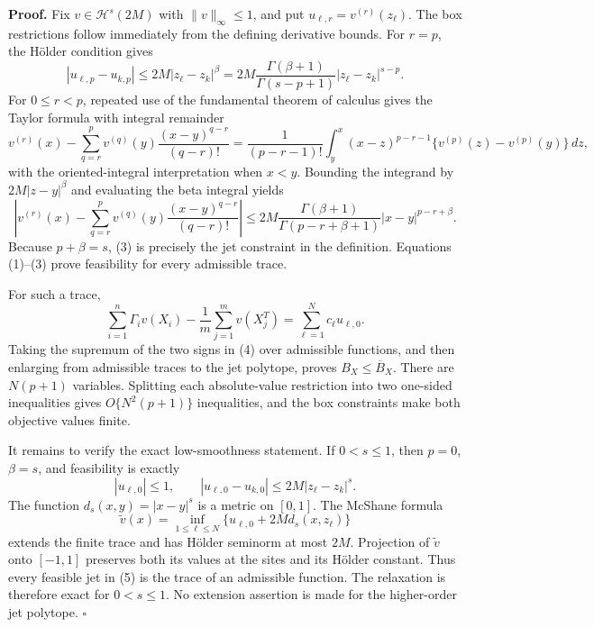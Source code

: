 \textbf{Proof.}
Fix \(v\in\mathcal H^s(2M)\) with \(\|v\|_\infty\le1\), and put \(u_{\ell,r}=v^{(r)}(z_\ell)\). The box restrictions follow immediately from the defining derivative bounds. For \(r=p\), the H\"older condition gives
\[
|u_{\ell,p}-u_{k,p}|\le2M|z_\ell-z_k|^\beta
=2M\frac{\Gamma(\beta+1)}{\Gamma(s-p+1)}|z_\ell-z_k|^{s-p}.
\tag{1}
\]
For \(0\le r<p\), repeated use of the fundamental theorem of calculus gives the Taylor formula with integral remainder
\[
v^{(r)}(x)-\sum_{q=r}^p v^{(q)}(y)\frac{(x-y)^{q-r}}{(q-r)!}
=\frac1{(p-r-1)!}\int_y^x(x-z)^{p-r-1}\{v^{(p)}(z)-v^{(p)}(y)\}\,dz,
\tag{2}
\]
with the oriented-integral interpretation when \(x<y\). Bounding the integrand by \(2M|z-y|^\beta\) and evaluating the beta integral yields
\[
\left|v^{(r)}(x)-\sum_{q=r}^p v^{(q)}(y)\frac{(x-y)^{q-r}}{(q-r)!}\right|
\le2M\frac{\Gamma(\beta+1)}{\Gamma(p-r+\beta+1)}|x-y|^{p-r+\beta}.
\tag{3}
\]
Because \(p+\beta=s\), (3) is precisely the jet constraint in the definition. Equations (1)--(3) prove feasibility for every admissible trace.

For such a trace,
\[
\sum_{i=1}^n\Gamma_i v(X_i)-\frac1m\sum_{j=1}^mv(X_j^T)
=\sum_{\ell=1}^Nc_\ell u_{\ell,0}.
\tag{4}
\]
Taking the supremum of the two signs in (4) over admissible functions, and then enlarging from admissible traces to the jet polytope, proves \(B_X\le\overline B_X\). There are \(N(p+1)\) variables. Splitting each absolute-value restriction into two one-sided inequalities gives \(O\{N^2(p+1)\}\) inequalities, and the box constraints make both objective values finite.

It remains to verify the exact low-smoothness statement. If \(0<s\le1\), then \(p=0\), \(\beta=s\), and feasibility is exactly
\[
|u_{\ell,0}|\le1,
\qquad
|u_{\ell,0}-u_{k,0}|\le2M|z_\ell-z_k|^s.
\tag{5}
\]
The function \(d_s(x,y)=|x-y|^s\) is a metric on \([0,1]\). The McShane formula
\[
\widetilde v(x)=\inf_{1\le\ell\le N}\{u_{\ell,0}+2M d_s(x,z_\ell)\}
\tag{6}
\]
extends the finite trace and has H\"older seminorm at most \(2M\). Projection of \(\widetilde v\) onto \([-1,1]\) preserves both its values at the sites and its H\"older constant. Thus every feasible jet in (5) is the trace of an admissible function. The relaxation is therefore exact for \(0<s\le1\). No extension assertion is made for the higher-order jet polytope. \(\square\)